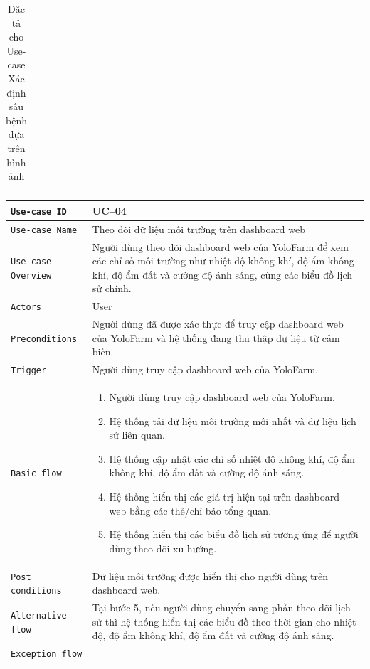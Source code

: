 \begin{longtable}{|P{4.8cm}|m{10cm}|}
	\caption{\label{table4}Đặc tả cho Use-case Xác định sâu bệnh dựa trên hình ảnh}
\end{longtable}
\begin{longtable}{|P{4.8cm}|m{10cm}|}\hline
	\texttt{Use-case ID} & UC--04\\
	\hline
	\texttt{Use-case Name} & Theo dõi dữ liệu môi trường trên dashboard web\\
	\hline
	\texttt{Use-case Overview} & Người dùng theo dõi dashboard web của YoloFarm để xem các chỉ số môi trường như nhiệt độ không khí, độ ẩm không khí, độ ẩm đất và cường độ ánh sáng, cùng các biểu đồ lịch sử chính.
	\\
	\hline
	\texttt{Actors} & User
	\\
	\hline
	\texttt{Preconditions} & Người dùng đã được xác thực để truy cập dashboard web của YoloFarm và hệ thống đang thu thập dữ liệu từ cảm biến.
	\\
	\hline
	\texttt{Trigger} & Người dùng truy cập dashboard web của YoloFarm.\\
	\hline
	\texttt{Basic flow} &
	\begin{enumerate}
		\item Người dùng truy cập dashboard web của YoloFarm.
		\item Hệ thống tải dữ liệu môi trường mới nhất và dữ liệu lịch sử liên quan.
		\item Hệ thống cập nhật các chỉ số nhiệt độ không khí, độ ẩm không khí, độ ẩm đất và cường độ ánh sáng.
		\item Hệ thống hiển thị các giá trị hiện tại trên dashboard web bằng các thẻ/chỉ báo tổng quan.
		\item Hệ thống hiển thị các biểu đồ lịch sử tương ứng để người dùng theo dõi xu hướng.
	\end{enumerate}
	\\
	\hline
	\texttt{Post conditions} &
	Dữ liệu môi trường được hiển thị cho người dùng trên dashboard web.
	\\
	\hline
	\texttt{Alternative flow} & Tại bước 5, nếu người dùng chuyển sang phần theo dõi lịch sử thì hệ thống hiển thị các biểu đồ theo thời gian cho nhiệt độ, độ ẩm không khí, độ ẩm đất và cường độ ánh sáng.\\
	\hline
	\texttt{Exception flow} &
	\begin{enumerate}[label = E\arabic*:]

\end{enumerate}
\end{longtable}
